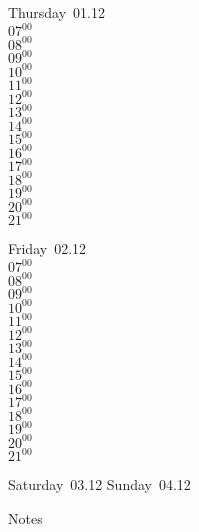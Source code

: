 \documentclass[11pt,a4paper]{book}\usepackage[]{graphicx}\usepackage[]{color}
\begin{document}
\clearpage
\begin{headerbox}
\end{headerbox}
\begin{weekdaybox}
  Thursday~01.12\\
  { 
  \vfill
  $07^{00}$\\
$08^{00}$\\
$09^{00}$\\
$10^{00}$\\
$11^{00}$\\
$12^{00}$\\
$13^{00}$\\
$14^{00}$\\
$15^{00}$\\
$16^{00}$\\
$17^{00}$\\
$18^{00}$\\
$19^{00}$\\
$20^{00}$\\
$21^{00}$\\
  }
\end{weekdaybox} 
\begin{weekdaybox}
  Friday~02.12\\
  { 
  \vfill
  $07^{00}$\\
$08^{00}$\\
$09^{00}$\\
$10^{00}$\\
$11^{00}$\\
$12^{00}$\\
$13^{00}$\\
$14^{00}$\\
$15^{00}$\\
$16^{00}$\\
$17^{00}$\\
$18^{00}$\\
$19^{00}$\\
$20^{00}$\\
$21^{00}$\\
  }
\end{weekdaybox}
\begin{weekendbox}
  Saturday~03.12
  \tcblower
  Sunday~04.12
\end{weekendbox} %
\begin{notebox}
  Notes
\end{notebox}
\clearpage
\end{document}
